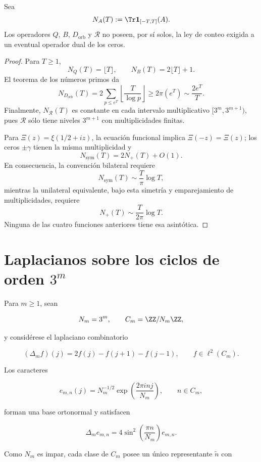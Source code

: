 \begin{proposition}
\label{pf84:E14}
Sea
\[
 N_A(T):=\Tr\mathbf1_{[-T,T]}(A).
\]
Los operadores \(Q\), \(B\), \(D_{\mathrm{orb}}\) y \(\mathcal R\) no
poseen, por sí solos, la ley de conteo exigida a un eventual operador dual
de los ceros.
\end{proposition}

\begin{proof}
Para \(T\ge1\),
\[
 N_Q(T)=\lfloor T\rfloor,
 \qquad
 N_B(T)=2\lfloor T\rfloor+1.
\]
El teorema de los números primos da
\[
 N_{D_{\mathrm{orb}}}(T)
 =2\sum_{p\le e^T}\left\lfloor\frac{T}{\log p}\right\rfloor
 \ge2\pi(e^T)\sim\frac{2e^T}{T}.
\]
Finalmente, \(N_{\mathcal R}(T)\) es constante en cada intervalo
multiplicativo \([3^m,3^{m+1})\), pues \(\mathcal R\) sólo tiene niveles
\(3^{m+1}\) con multiplicidades finitas.

Para
\(\Xi(z)=\xi(1/2+iz)\), la ecuación funcional implica
\(\Xi(-z)=\Xi(z)\); los ceros \(\pm\gamma\) tienen la misma multiplicidad y
\[
 N_{\mathrm{sym}}(T)=2N_+(T)+O(1).
\]
En consecuencia, la convención bilateral requiere
\[
 N_{\mathrm{sym}}(T)\sim\frac{T}{\pi}\log T,
\]
mientras la unilateral equivalente, bajo esta simetría y emparejamiento de
multiplicidades, requiere
\[
 N_+(T)\sim\frac{T}{2\pi}\log T.
\]
Ninguna de las cuatro funciones anteriores tiene esa asintótica.
\end{proof}

\section{Laplacianos sobre los ciclos de orden \texorpdfstring{$3^m$}{potencias de tres}}

Para $m\geq 1$, sean

\[
 N_m=3^m,
 \qquad
 C_m=\ZZ/N_m\ZZ,
\]

y considérese el laplaciano combinatorio

\[
 (\Delta_m f)(j)=2f(j)-f(j+1)-f(j-1),
 \qquad f\in\ell^2(C_m).
\]

Los caracteres

\[
 e_{m,n}(j)=N_m^{-1/2}
 \exp\!\left(\frac{2\pi i n j}{N_m}\right),
 \qquad n\in C_m,
\]

forman una base ortonormal y satisfacen

\[
 \Delta_m e_{m,n}
 =4\sin^2\!\left(\frac{\pi n}{N_m}\right)e_{m,n}.
\]

Como $N_m$ es impar, cada clase de $C_m$ posee un único representante
$\widetilde n$ con

